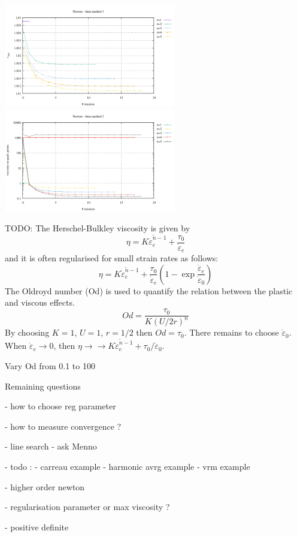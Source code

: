 \begin{center}
\includegraphics[width=7.5cm]{python_codes/fieldstone_87/results/experiment_11/vrms_meth3.pdf}
\includegraphics[width=7.5cm]{python_codes/fieldstone_87/results/experiment_11/stats_etaq_meth3.pdf}
\end{center}

TODO: The Herschel-Bulkley viscosity is given by
\[
\eta 
= K \dot{\varepsilon}_e^{\tilde{n}-1} + \frac{\tau_0}{\dot\varepsilon_e}
\]
and it is often regularised for small strain rates as follows:
\[
\eta 
= K \dot{\varepsilon}_e^{\tilde{n}-1} + \frac{\tau_0}{\dot\varepsilon_e}
\left(
1 - \exp \frac{\dot\varepsilon_e}{\dot\varepsilon_0}
\right)
\]
The Oldroyd number (Od) is used to quantify
the relation between the plastic and viscous effects.
\cite{demj04}
\[
Od =  \frac{\tau_0}{K (U/2r)^n}
\]
By choosing $K=1$, $U=1$, $r=1/2$ then $Od=\tau_0$. 
There remains to choose $\dot\varepsilon_0$. When $\dot\varepsilon_e \rightarrow 0$,
then $\eta \rightarrow \rightarrow K \dot{\varepsilon}_e^{\tilde{n}-1} + \tau_0/\dot\varepsilon_0$.



Vary Od from 0.1 to 100 




\newpage

Remaining questions

- how to choose reg parameter

- how to measure convergence ?

- line search - ask Menno

- todo : 
  - carreau example
  - harmonic avrg example
  - vrm example

- higher order newton

- regularisation parameter or max viscosity ?

- positive definite

